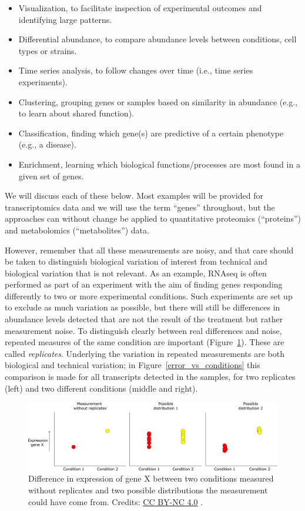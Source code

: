 \begin{itemize}
\item Visualization, to facilitate inspection of experimental outcomes and
identifying large patterns.
\item Differential abundance, to compare abundance levels between
conditions, cell types or strains.
\item Time series analysis, to follow changes over time (i.e., time series
experiments).
\item Clustering, grouping genes or samples based on similarity in abundance
(e.g., to learn about shared function).
\item Classification, finding which gene(s) are predictive of a certain
phenotype (e.g., a disease).
\item Enrichment, learning which biological functions/processes are most found
in a given set of genes.
\end{itemize}

We will discuss each of these below. Most examples will be provided for
transcriptomics data and we will use the term ``genes'' throughout, but the
approaches can without change be applied to quantitative proteomics
(``proteins'') and metabolomics (``metabolites'') data.

However, remember that all these measurements are noisy, and that care
should be taken to distinguish biological variation of interest from
technical and biological variation that is not relevant. As an example,
RNAseq is often performed as part of an experiment with the aim of finding
genes responding differently to two or more experimental conditions. Such
experiments are set up to exclude as much variation as possible, but there
will still be differences in abundance levels detected that are not the
result of the treatment but rather measurement noise. To distinguish
clearly between real differences and noise, repeated measures of the same
condition are important (Figure~\ref{compare_conditions}). These are called \textit{replicates}.
Underlying the variation in repeated measurements are both biological and
technical variation; in Figure~\ref{error_vs_conditions} this comparison is made for all
transcripts detected in the samples, for two replicates (left) and two
different conditions (middle and right).

\begin{figure}[!htbp]
\centering
\includegraphics[width=0.7\linewidth]{files/compare-conditions-8407ef978ebe82f1ec8daa7e0e345017.pdf}
\caption[]{Difference in expression of gene X between two conditions measured without replicates and two possible distributions the measurement could have come from.
Credits: \href{https://creativecommons.org/licenses/by-nc/4.0/}{CC BY-NC 4.0} \cite{own_5_2024}.}
\label{compare_conditions}
\end{figure}


